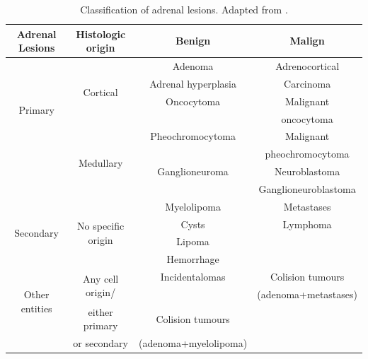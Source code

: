 \documentclass[11pt]{article}
\begin{document}
\begin{table}[]
    \centering
    \begin{tabular}{cccc}\toprule
        \textbf{Adrenal Lesions}        & \textbf{Histologic origin}          & \textbf{Benign}       & \textbf{Malign}      \\
        \midrule
        \multirow{6}{*}{Primary}        & \multirow{4}{*}{Cortical}           & Adenoma               & Adrenocortical       \\
                                        &                                     & Adrenal hyperplasia   & Carcinoma            \\
                                        &                                     & Oncocytoma            & Malignant            \\
                                        &                                     &                       & oncocytoma           \\
        \cmidrule(lr){2-4}
                                        & \multirow{4}{*}{Medullary}          & Pheochromocytoma      & Malignant            \\
                                        &                                     &                       & pheochromocytoma     \\
                                        &                                     & Ganglioneuroma        & Neuroblastoma        \\
                                        &                                     &                       & Ganglioneuroblastoma \\
        \midrule
        \multirow{4}{*}{Secondary}      & \multirow{4}{*}{No specific origin} & Myelolipoma           & Metastases           \\
                                        &                                     & Cysts                 & Lymphoma             \\
                                        &                                     & Lipoma                &                      \\
                                        &                                     & Hemorrhage            &                      \\
        \midrule
        \multirow{3}{*}{Other entities} & \multirow{2}{*}{Any cell origin/}   & Incidentalomas        & Colision tumours     \\
                                        &                                     &                       & (adenoma+metastases) \\
                                        & \multirow{1}{*}{either primary}     & Colision tumours      &                      \\
                                        & \multirow{1}{*}{or secondary}       & (adenoma+myelolipoma) &

        \\\bottomrule
    \end{tabular}
    \caption{Classification of adrenal lesions.  Adapted from \cite{Panda2015}.}
    \label{tab:lesions}
\end{table}
\end{document}

